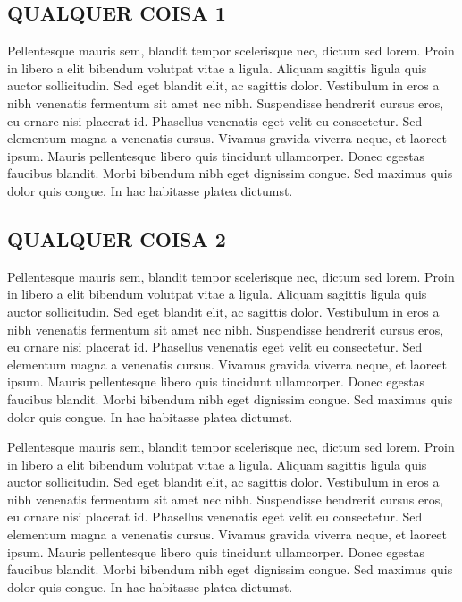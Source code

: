 \documentclass[10pt,twocolumn,letterpaper]{article}
\begin{document}
\subsection{QUALQUER COISA 1}

Pellentesque mauris sem, blandit tempor scelerisque nec, dictum sed lorem. Proin in libero a elit bibendum volutpat vitae a ligula. Aliquam sagittis ligula quis auctor sollicitudin. Sed eget blandit elit, ac sagittis dolor. Vestibulum in eros a nibh venenatis fermentum sit amet nec nibh. Suspendisse hendrerit cursus eros, eu ornare nisi placerat id. Phasellus venenatis eget velit eu consectetur. Sed elementum magna a venenatis cursus. Vivamus gravida viverra neque, et laoreet ipsum. Mauris pellentesque libero quis tincidunt ullamcorper. Donec egestas faucibus blandit. Morbi bibendum nibh eget dignissim congue. Sed maximus quis dolor quis congue. In hac habitasse platea dictumst.

\subsection{QUALQUER COISA 2}
Pellentesque mauris sem, blandit tempor scelerisque nec, dictum sed lorem. Proin in libero a elit bibendum volutpat vitae a ligula. Aliquam sagittis ligula quis auctor sollicitudin. Sed eget blandit elit, ac sagittis dolor. Vestibulum in eros a nibh venenatis fermentum sit amet nec nibh. Suspendisse hendrerit cursus eros, eu ornare nisi placerat id. Phasellus venenatis eget velit eu consectetur. Sed elementum magna a venenatis cursus. Vivamus gravida viverra neque, et laoreet ipsum. Mauris pellentesque libero quis tincidunt ullamcorper. Donec egestas faucibus blandit. Morbi bibendum nibh eget dignissim congue. Sed maximus quis dolor quis congue. In hac habitasse platea dictumst.

Pellentesque mauris sem, blandit tempor scelerisque nec, dictum sed lorem. Proin in libero a elit bibendum volutpat vitae a ligula. Aliquam sagittis ligula quis auctor sollicitudin. Sed eget blandit elit, ac sagittis dolor. Vestibulum in eros a nibh venenatis fermentum sit amet nec nibh. Suspendisse hendrerit cursus eros, eu ornare nisi placerat id. Phasellus venenatis eget velit eu consectetur. Sed elementum magna a venenatis cursus. Vivamus gravida viverra neque, et laoreet ipsum. Mauris pellentesque libero quis tincidunt ullamcorper. Donec egestas faucibus blandit. Morbi bibendum nibh eget dignissim congue. Sed maximus quis dolor quis congue. In hac habitasse platea dictumst.
\end{document}
